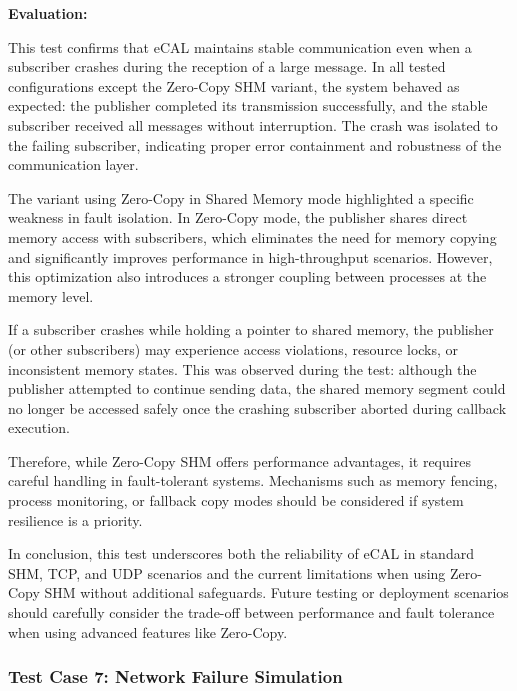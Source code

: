 \vspace{0.5em}

\textbf{Evaluation:}

\vspace{0.4em}
This test confirms that eCAL maintains stable communication even when a subscriber crashes during the reception of a large message. In all tested configurations except the Zero-Copy SHM variant, the system behaved as expected: the publisher completed its transmission successfully, and the stable subscriber received all messages without interruption. The crash was isolated to the failing subscriber, indicating proper error containment and robustness of the communication layer.

\vspace{1em}
The variant using Zero-Copy in Shared Memory mode highlighted a specific weakness in fault isolation. In Zero-Copy mode, the publisher shares direct memory access with subscribers, which eliminates the need for memory copying and significantly improves performance in high-throughput scenarios. However, this optimization also introduces a stronger coupling between processes at the memory level.

\vspace{1em}
If a subscriber crashes while holding a pointer to shared memory, the publisher (or other subscribers) may experience access violations, resource locks, or inconsistent memory states. This was observed during the test: although the publisher attempted to continue sending data, the shared memory segment could no longer be accessed safely once the crashing subscriber aborted during callback execution. 

\vspace{1em}
Therefore, while Zero-Copy SHM offers performance advantages, it requires careful handling in fault-tolerant systems. Mechanisms such as memory fencing, process monitoring, or fallback copy modes should be considered if system resilience is a priority.

\vspace{1em}
In conclusion, this test underscores both the reliability of eCAL in standard SHM, TCP, and UDP scenarios and the current limitations when using Zero-Copy SHM without additional safeguards. Future testing or deployment scenarios should carefully consider the trade-off between performance and fault tolerance when using advanced features like Zero-Copy.

\vspace{1em}
\subsubsection{Test Case 7: Network Failure Simulation}
\label{sec:tc7}

